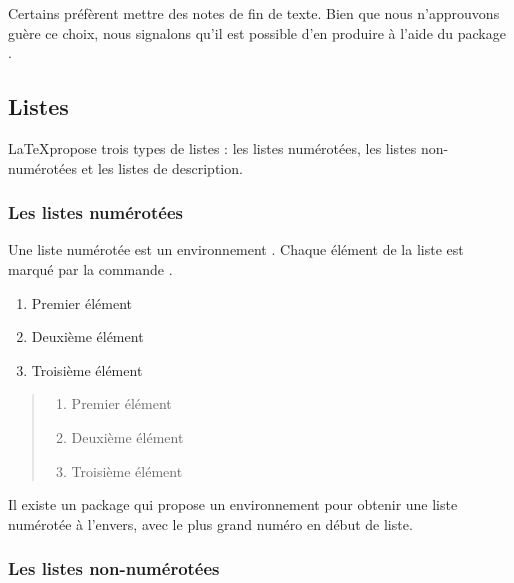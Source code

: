 \begin{plusloins}
    Certains préfèrent mettre des notes de fin de texte. Bien que nous n'approuvons guère ce choix, nous signalons qu'il est possible d'en produire à l'aide du package .
\end{plusloins}

\subsection{Listes}

\LaTeX propose trois types de listes : les listes numérotées, les listes non-numérotées et les listes de description.

\subsubsection{Les listes numérotées}

Une liste numérotée est un environnement .
Chaque élément de la liste est marqué par la commande .

\begin{latexcode}
\begin{enumerate}
    \item Premier élément
    \item Deuxième élément
    \item Troisième élément
\end{enumerate}
\end{latexcode}

\begin{quotation}
\noindent\begin{enumerate}
    \item Premier élément
    \item Deuxième élément
    \item Troisième élément
\end{enumerate}
\end{quotation}

\begin{plusloins}
Il existe un package  qui propose un environnement   pour obtenir une liste numérotée à l'envers, avec le plus grand numéro en début de liste.

\end{plusloins}
\subsubsection{Les listes non-numérotées}

